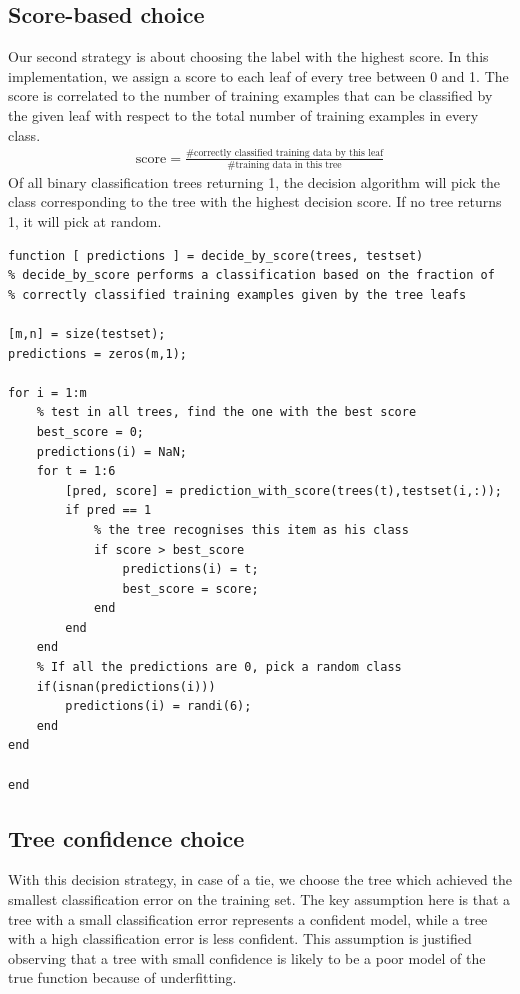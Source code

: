 \documentclass{article}
\begin{document}
\subsection{Score-based choice}
Our second strategy is about choosing the label with the highest score. In this implementation, we assign a score to each leaf of every tree between 0 and 1. The score is correlated to the number of training examples that can be classified by the given leaf with respect to the total number of training examples in every class.
\begin{align*}
    \textrm{score} = \frac{\textrm{\# correctly classified training data by this leaf}}{\textrm{\# training data in this tree}}
\end{align*}
Of all binary classification trees returning 1, the decision algorithm will pick the class corresponding to the tree with the highest decision score. If no tree returns 1, it will pick at random.
\begin{lstlisting}
function [ predictions ] = decide_by_score(trees, testset)
% decide_by_score performs a classification based on the fraction of
% correctly classified training examples given by the tree leafs

[m,n] = size(testset);
predictions = zeros(m,1);

for i = 1:m
    % test in all trees, find the one with the best score
    best_score = 0;
    predictions(i) = NaN;
    for t = 1:6
        [pred, score] = prediction_with_score(trees(t),testset(i,:));
        if pred == 1
            % the tree recognises this item as his class
            if score > best_score
                predictions(i) = t;
                best_score = score;
            end
        end
    end
    % If all the predictions are 0, pick a random class
    if(isnan(predictions(i)))
        predictions(i) = randi(6);
    end
end

end
\end{lstlisting}

\subsection{Tree confidence choice}
With this decision strategy, in case of a tie, we choose the tree which achieved the smallest classification error on the training set. The key assumption here is that a tree with a small classification error represents a confident model, while a tree with a high classification error is less confident. This assumption is justified observing that a tree with small confidence is likely to be a poor model of the true function because of underfitting. 
\end{document}
